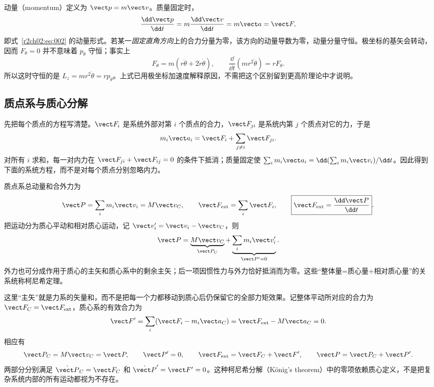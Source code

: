 动量（momentum）定义为 $\vect p=m\vect v$。质量固定时，
\[
 \frac{\dd\vect p}{\dd t}=m\frac{\dd\vect v}{\dd t}=m\vect a=\vect F,
\]
即式~\eqref{r2ch02:eq:002} 的动量形式。若某一\emph{固定直角方向}上的合力分量为零，该方向的动量导数为零，动量分量守恒。极坐标的基矢会转动，因而 $F_\theta=0$ 并不意味着 $p_\theta$ 守恒；事实上
\[
 F_\theta=m(r\ddot\theta+2\dot r\dot\theta),\qquad
 \frac{\dd}{\dd t}(mr^2\dot\theta)=rF_\theta.
\]
所以这时守恒的是 $L_z=mr^2\dot\theta=rp_\theta$。上式已用极坐标加速度解释原因，不需把这个区别留到更高阶理论中才说明。

\subsection{质点系与质心分解}
\label{r2ch02:sec:system-momentum}

先把每个质点的方程写清楚。$\vect F_i$ 是系统外部对第 $i$ 个质点的合力，$\vect F_{ji}$ 是系统内第 $j$ 个质点对它的力，于是
\[
 m_i\vect a_i=\vect F_i+\sum_{j\ne i}\vect F_{ji}.
\]
对所有 $i$ 求和，每一对内力在 $\vect F_{ji}+\vect F_{ij}=0$ 的条件下抵消；质量固定使 $\sum_i m_i\vect a_i=\dd(\sum_i m_i\vect v_i)/\dd t$。因此得到下面的系统方程，而不是对每个质点分别忽略内力。

质点系总动量和合外力为
\begin{equation}
 \vect P=\sum_i m_i\vect v_i=M\vect v_C,\qquad
 \vect F_{\rm ext}=\sum_i\vect F_i,\qquad
 \boxed{\vect F_{\rm ext}=\frac{\dd\vect P}{\dd t}}.
 \label{r2ch02:eq:008}
\end{equation}
把运动分为质心平动和相对质心运动，记 $\vect v_i'=\vect v_i-\vect v_C$，则
\begin{equation}
 \vect P=\underbrace{M\vect v_C}_{\vect P_C}
 +\underbrace{\sum_i m_i\vect v_i'}_{\vect P'=0}.
 \label{r2ch02:eq:009}
\end{equation}
外力也可分成作用于质心的主矢和质心系中的剩余主矢；后一项因惯性力与外力恰好抵消而为零。这些“整体量=质心量+相对质心量”的关系统称柯尼希定理。

这里“主矢”就是力系的矢量和，而不是把每一个力都移动到质心后仍保留它的全部力矩效果。记整体平动所对应的合力为 $\vect F_C=\vect F_{\rm ext}$，质心系的有效合力为
\[
 \vect F'=\sum_i(\vect F_i-m_i\vect a_C)
 =\vect F_{\rm ext}-M\vect a_C=0.
\]
相应有
\[
 \vect P_C=M\vect v_C=\vect P,\qquad \vect P'=0,
 \qquad \vect F_{\rm ext}=\vect F_C+\vect F',\qquad
 \vect P=\vect P_C+\vect P'.
\]
两部分分别满足 $\dot{\vect P}_C=\vect F_C$ 和 $\dot{\vect P}'=\vect F'=0$。这种柯尼希分解（König's theorem）中的零项依赖质心定义，不是把复杂系统内部的所有运动都视为不存在。

